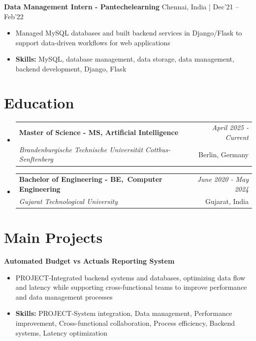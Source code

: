 \documentclass[a4paper,11pt]{article}
\makeatletter
\newcommand{\resumeSubheading}[4]{
\vspace{0.5mm}\item
    \begin{tabular*}{0.98\textwidth}[t]{l@{\extracolsep{\fill}}r}
        \textbf{#1} & \textit{\footnotesize{#4}} \\
        \textit{\footnotesize{#3}} &  \footnotesize{#2}\\
    \end{tabular*}
    \vspace{-2.4mm}
}
\makeatother
\begin{document}
\vspace{1mm}
  \textbf{ Data Management Intern - Pantechelearning} \hfill Chennai, India | Dec'21 -- Feb'22
\vspace{-1.5mm} %
\begin{itemize}
  \item Managed MySQL databases and built backend services in Django/Flask to support data-driven workflows for web applications
\vspace{-2mm}
  \item \textbf{Skills:} MySQL, database management, data storage, data management, backend development, Django, Flask
\end{itemize}\section{\textbf{Education}}
\vspace{-0.4mm}

\begin{itemize}
\resumeSubheading
{Master of Science - MS, Artificial Intelligence }{Berlin, Germany}
{Brandenburgische Technische Universität Cottbus-Senftenberg  }{April 2025 - Current}

\vspace{1.0mm} %
\resumeSubheading
{Bachelor of Engineering - BE, Computer Engineering  }{Gujarat, India}
{Gujarat Technological University }{June 2020 - May 2024}

\end{itemize}
\section{\textbf{Main Projects}}

\vspace{1mm}
  \textbf{Automated Budget vs Actuals Reporting System  } 
\vspace{-1.5mm} %
\begin{itemize}
  \item PROJECT-Integrated backend systems and databases, optimizing data flow and latency while supporting cross-functional teams to improve performance and data management processes
\vspace{-3mm}
  \item \textbf{Skills:} PROJECT-System integration, Data management, Performance improvement, Cross-functional collaboration, Process efficiency, Backend systems, Latency optimization
\end{itemize}
\end{document}

